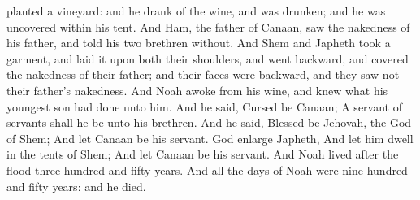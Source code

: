 planted a vineyard: and he drank of the wine, and was drunken; and he was uncovered within his tent. And Ham, the father of Canaan, saw the nakedness of his father, and told his two brethren without. And Shem and Japheth took a garment, and laid it upon both their shoulders, and went backward, and covered the nakedness of their father; and their faces were backward, and they saw not their father’s nakedness. And Noah awoke from his wine, and knew what his youngest son had done unto him. And he said, Cursed be Canaan; A servant of servants shall he be unto his brethren.  And he said, Blessed be Jehovah, the God of Shem; And let Canaan be his servant.  God enlarge Japheth, And let him dwell in the tents of Shem; And let Canaan be his servant.  And Noah lived after the flood three hundred and fifty years. And all the days of Noah were nine hundred and fifty years: and he died. 

